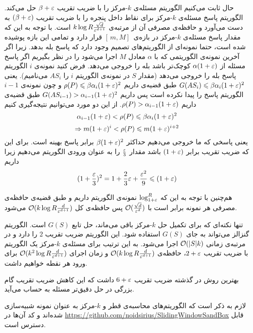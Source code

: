 حال ثابت می‌کنیم الگوریتم  مسئله‌ی $k$-مرکز را با ضریب تقریب $ \beta + \varepsilon$ حل می‌کند.
الگوریتم   پاسخ مسئله‌ی $k$-مرکز برای نقاط داخل پنجره را با ضریب تقریب $(\beta+\varepsilon)$ به دست می‌آورد و حافظه‌ی مصرفی آن از مرتبه‌ی 
$ k \log R \frac{\sqrt{d}}{\varepsilon^{d+1}}$
است.
با توجه به این که مقدار پاسخ مسئله‌ی $k$-مرکز در بازه‌ی $ [\, m, M]\,$ قرار دارد و تمامی این بازه پوشیده شده است، حتما نمونه‌ای از الگوریتم‌های تصمیم وجود دارد که پاسخ بله بدهد. زیرا اگر آخرین نمونه‌ی الگوریتمی که با $\alpha$ معادل $M$ اجرا می‌شود را در نظر بگیریم اگر پاسخ مسئله از 
$\alpha (1 +\varepsilon)$
کوچک‌تر باشد بله را خروجی می‌دهد. فرض کنید نمونه‌ی $i$ الگوریتم پاسخ بله را خروجی می‌دهد (مقدار $S$ در نمونه‌ی الگوریتم $i$ را $AS_i$ می‌نامیم). یعنی
$ G(AS_i) \leqslant \beta \alpha_i (1 + \varepsilon) ^ 2 $
طبق قضیه‌ی  داریم
$ \rho(P) \leqslant \beta \alpha_i (1 + \varepsilon) ^ 2 $
و چون نمونه‌ی $i-1$ الگوریتم  پاسخ را پیدا نکرده است پس داریم
$ G(AS_{i-1}) > \alpha_{i-1} (1+\varepsilon)^2$
طبق قضیه‌ی  داریم
$ \rho(P) >  \alpha_{i-1} (1 + \varepsilon) $.
از این دو مورد می‌توانیم نتیجه‌گیری کنیم
$$   \alpha_{i-1} (1 + \varepsilon) < \rho(P) \leqslant  \beta \alpha_i (1 + \varepsilon) ^ 2  $$
$$ \Rightarrow m (1+\varepsilon)^i < \rho(P) \leqslant m (1+\varepsilon)^{i+2} $$
یعنی پاسخی که ما خروجی می‌دهیم حداکثر 
$\beta (1 + \varepsilon)^2$
برابر پاسخ بهینه است. برای این که ضریب تقریب برابر $(1+\varepsilon)$ باشد مقدار $\frac{\varepsilon}{3}$ را به عنوان ورودی الگوریتم می‌دهیم زیرا داریم
$$ (1+\frac{\varepsilon}{3})^2 = 1 + \frac{2}{3} \varepsilon + \frac{\varepsilon^2}{9} \leqslant (1+\varepsilon)$$

هم‌چنین با توجه به این که $\log_{1+\varepsilon}^{R} $ نمونه‌ی الگوریتم داریم و طبق قضیه‌ی  حافظه‌ی مصرفی هر نمونه برابر است با 
$\mathcal{O}(\frac{\sqrt{d}}{\varepsilon^d})$
پس حافظه‌ی کل
$ \mathcal{O}(k \log R \frac{d}{\varepsilon^{d+1}})$
می‌شود.

تنها نکته‌ای که برای تکمیل حل $k$-مرکز باقی می‌ماند، حل تابع $G(S)$ است. الگوریتم گنزالز می‌تواند به جای $G(S)$ استفاده شود. این الگوریتم ضریب تقریب $2$ را دارد و در مرتبه‌ی زمانی $\mathcal{O}(|S| k)$ اجرا می‌شود. به این ترتیب برای مسئله‌ی $k$-مرکز یک الگوریتم با ضریب تقریب $2+\varepsilon$، حافظه‌ی
$ \mathcal{O}(k \log R \frac{d}{\varepsilon^{d+1}})$
و زمان اجرای
$ \mathcal{O}(k^2 \log R \frac{d}{\varepsilon^{d+1}})$
برای ورود هر نقطه خواهیم داشت.

بهترین روش در گذشته ضریب تقریب $6+\varepsilon$ داشت  که این کاهش ضریب تقریب گام بزرگی در حل دقیق‌تر مسئله به حساب می‌آید.

لازم به ذکر است که الگوریتم‌های محاسبه‌ی قطر و $k$-مرکز به عنوان نمونه شبیه‌سازی شده‌اند و کد آن‌ها در 
\href{https://github.com/noidsirius/SlidingWindowSandBox}{https://github.com/noidsirius/SlidingWindowSandBox}
قابل دسترس است.